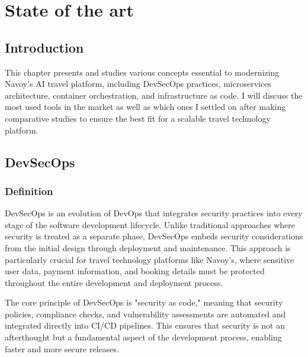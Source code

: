 \chapter{State of the art}
\minitoc
\newpage

\setcounter{secnumdepth}{0} %
\section{Introduction}
This chapter presents and studies various concepts essential to modernizing Navoy's AI travel platform, including DevSecOps practices, microservices architecture, container orchestration, and infrastructure as code.
I will discuss the most used tools in the market as well as which ones I settled on after making comparative studies to ensure the best fit for a scalable travel technology platform.

\setcounter{secnumdepth}{2} %
\section{DevSecOps}

\subsection{Definition}
DevSecOps is an evolution of DevOps that integrates security practices into every stage of the software development lifecycle. Unlike traditional approaches where security is treated as a separate phase, DevSecOps embeds security considerations from the initial design through deployment and maintenance. This approach is particularly crucial for travel technology platforms like Navoy's, where sensitive user data, payment information, and booking details must be protected throughout the entire development and deployment process.

The core principle of DevSecOps is "security as code," meaning that security policies, compliance checks, and vulnerability assessments are automated and integrated directly into CI/CD pipelines. This ensures that security is not an afterthought but a fundamental aspect of the development process, enabling faster and more secure releases.

